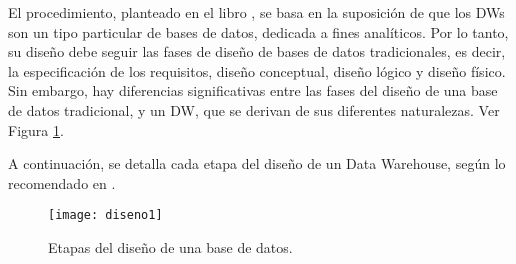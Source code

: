 \documentclass[a4paper,11pt]{article}
\begin{document}
    El procedimiento, planteado en el libro \cite{VaismanZimanyi14}, se basa en la suposición de que los DWs son un tipo particular de bases de datos,  dedicada
    a fines analíticos.
    Por lo tanto, su diseño debe seguir las fases de diseño de bases de datos tradicionales, es decir, la especificación de los requisitos, diseño conceptual, diseño 
    lógico y diseño físico. Sin embargo, hay diferencias significativas entre las fases del diseño de una base de datos tradicional, y un DW, que se derivan de sus
    diferentes naturalezas. Ver Figura \ref{etapasDiseño}.
    
    A continuación, se detalla cada etapa del diseño de un Data Warehouse, según lo recomendado en \cite{VaismanZimanyi14}.
    
    \begin{figure}
      \texttt{[image: diseno1]}  
      \caption{Etapas del diseño de una base de datos.}
      \label{etapasDiseño}
    \end{figure}
    
\end{document}
